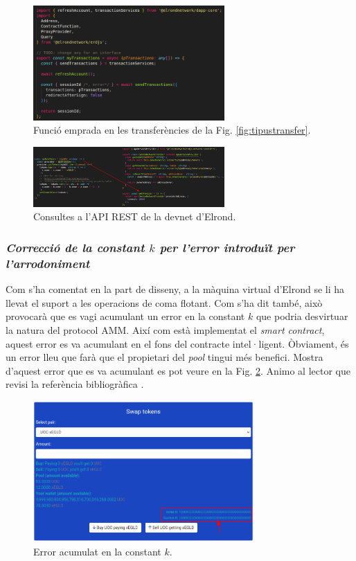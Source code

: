 \documentclass[11pt,a4paper]{article}
\begin{document}
\begin{figure}[h]
\includegraphics[width=0.65\textwidth]{imp-mytransactions.png}
\centering
\caption{Funció emprada en les transferències de la Fig. \ref{fig:tipustransfer}.}
\end{figure} 

\begin{figure}[h]
\includegraphics[width=0.65\textwidth]{imp-queryapirest.png}
\centering
\caption{Consultes a l'API REST de la devnet d'Elrond.}\label{fig:imp-queryapirest}
\end{figure} 

\subsubsection{\textit{Correcció de la constant \(k\) per l'error introduït per l'arrodoniment}}
Com s'ha comentat en la part de disseny, a la màquina virtual d'Elrond se li ha llevat el suport a les operacions de coma flotant. Com s'ha dit també, això provocarà que es vagi acumulant un error en la constant \(k\) que podria desvirtuar la natura del protocol AMM. Així com està implementat el \textit{smart contract}, aquest error es va acumulant en el fons del contracte intel·ligent. Òbviament, és un error lleu que farà que el propietari del \textit{pool} tingui més benefici. Mostra d'aquest error que es va acumulant es pot veure en la Fig. \ref{fig:imperrork}. Animo al lector que revisi la referència bibliogràfica \cite{zhang2018}.

\begin{figure}[h]
\includegraphics[width=0.75\textwidth]{imp-errork.png}
\centering
\caption{Error acumulat en la constant \(k\).}\label{fig:imperrork}
\end{figure} 
\end{document}
